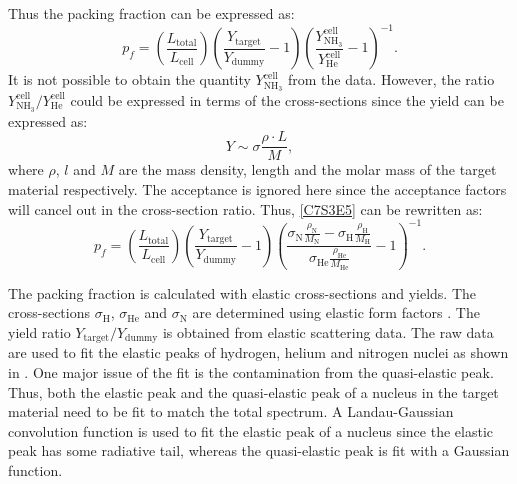 Thus the packing fraction can be expressed as:
\begin{equation} \label{C7S3E5}
p_f = \left(\frac{L_{\mathrm{total}}}{L_{\mathrm{cell}}}\right)\left(\frac{Y_{\mathrm{target}}}{Y_{\mathrm{dummy}}}-1\right)\left(\frac{Y_{\mathrm{NH_3}}^{\mathrm{cell}}}{Y_{\mathrm{He}}^{\mathrm{cell}}}-1\right)^{-1}.
\end{equation}
It is not possible to obtain the quantity $Y_{\mathrm{NH_3}}^{\mathrm{cell}}$ from the data. However, the ratio $Y_{\mathrm{NH_3}}^{\mathrm{cell}}/Y_{\mathrm{He}}^{\mathrm{cell}}$ could be expressed in terms of the cross-sections since the yield can be expressed as:
\begin{equation} \label{C7S3E6}
Y \sim \sigma\frac{\rho\cdot L}{M},
\end{equation}
where $\rho$, $l$ and $M$ are the mass density, length and the molar mass of the target material respectively. The acceptance is ignored here since the acceptance factors will cancel out in the cross-section ratio. Thus, \cref{C7S3E5} can be rewritten as:
\begin{equation} \label{C7S3E7}
p_f = \left(\frac{L_{\mathrm{total}}}{L_{\mathrm{cell}}}\right)\left(\frac{Y_{\mathrm{target}}}{Y_{\mathrm{dummy}}}-1\right)\left(\frac{\sigma_{\mathrm{N}}\frac{\rho_{\mathrm{N}}}{M_{\mathrm{N}}}-\sigma_{\mathrm{H}}\frac{\rho_{\mathrm{H}}}{M_{\mathrm{H}}}}{\sigma_{\mathrm{He}}\frac{\rho_{\mathrm{He}}}{M_{\mathrm{He}}}}-1\right)^{-1}.
\end{equation}

The packing fraction is calculated with elastic cross-sections and yields. The cross-sections $\sigma_{\mathrm{H}}$, $\sigma_{\mathrm{He}}$ and $\sigma_{\mathrm{N}}$ are determined using elastic form factors \cite{Venkat2011,Jager1974}. The yield ratio $Y_{\mathrm{target}}/Y_{\mathrm{dummy}}$ is obtained from elastic scattering data. The raw data are used to fit the elastic peaks of hydrogen, helium and nitrogen nuclei as shown in . One major issue of the fit is the contamination from the quasi-elastic peak. Thus, both the elastic peak and the quasi-elastic peak of a nucleus in the target material need to be fit to match the total spectrum. A Landau-Gaussian convolution function is used to fit the elastic peak of a nucleus since the elastic peak has some radiative tail, whereas the quasi-elastic peak is fit with a Gaussian function.

